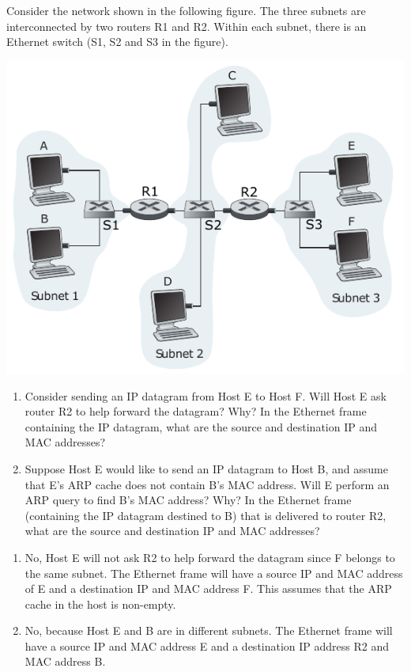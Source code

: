 \documentclass{report}
\begin{document}
\begin{problem}
\end{problem}

\begin{problem}

Consider the network shown in the following figure. The three subnets are interconnected by two routers R1 and R2. Within each subnet, there is an Ethernet switch (S1, S2 and S3 in the figure).

\begin{center}
    \includegraphics[width=0.5\linewidth]{figures/hw8-rs.pdf}
\end{center}

\begin{enumerate}
    \item Consider sending an IP datagram from Host E to Host F. Will Host E ask router R2 to help forward the datagram? Why? In the Ethernet frame containing the IP datagram, what are the source and destination IP and MAC addresses?
    \item Suppose Host E would like to send an IP datagram to Host B, and assume that E’s  ARP cache does not contain B’s MAC address. Will E perform an ARP  query to find B’s MAC address? Why? In the Ethernet frame (containing  the IP datagram destined to B) that is delivered to router R2, what are the source and destination IP and MAC addresses?

\end{enumerate}

\begin{answer}{30em}
    \begin{enumerate}
        \item No, Host E will not ask R2 to help forward the datagram since F belongs to the same
            subnet. The Ethernet frame will have a source IP and MAC address of E and a destination
            IP and MAC address F. This assumes that the ARP cache in the host is non-empty.
        \item No, because Host E and B are in different subnets. The Ethernet frame will have a
            source IP and MAC address E and a destination IP address R2 and MAC address B.
    \end{enumerate}
\end{answer}
\end{problem}
\end{document}
